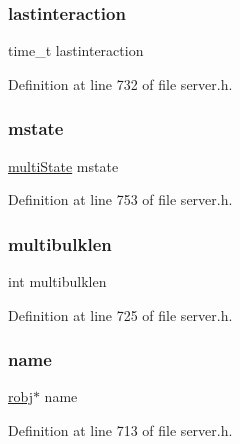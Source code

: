 \subsubsection{\texorpdfstring{lastinteraction}{lastinteraction}}
{\footnotesize\ttfamily time\+\_\+t lastinteraction}



Definition at line 732 of file server.\+h.

\mbox{\label{structclient_a41bf43ebb391b4e37deb2cb287a8bd1c}} 
\subsubsection{\texorpdfstring{mstate}{mstate}}
{\footnotesize\ttfamily \hyperlink{structmulti_state}{multi\+State} mstate}



Definition at line 753 of file server.\+h.

\mbox{\label{structclient_a0fb4b72a537074c92ed763feb2d46d91}} 
\subsubsection{\texorpdfstring{multibulklen}{multibulklen}}
{\footnotesize\ttfamily int multibulklen}



Definition at line 725 of file server.\+h.

\mbox{\label{structclient_a363eae5cb1f099d7803cca951bef7ac2}} 
\subsubsection{\texorpdfstring{name}{name}}
{\footnotesize\ttfamily \hyperlink{server_8h_a540f174d2685422fbd7d12e3cd44c8e2}{robj}$\ast$ name}



Definition at line 713 of file server.\+h.

\mbox{\label{structclient_a5b716e337597169d53bb91dc9a68adc6}} 
